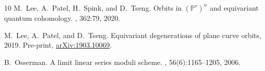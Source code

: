 \documentclass[11pt]{amsart}
\begin{document}
\begin{thebibliography}{10}
M.~Lee, A.~Patel, H.~Spink, and D.~Tseng.
\newblock Orbits in {{\((\mathbb{P}^r)^n\)}} and equivariant quantum
  cohomology.
, 362:79, 2020.

M.~Lee, A.~Patel, and D.~Tseng.
\newblock Equivariant degenerations of plane curve orbits, 2019.
\newblock Pre-print, \href{https://arxiv.org/abs/1903.10069}{arXiv:1903.10069}.

B.~Osserman.
\newblock A limit linear series moduli scheme.
, 56(6):1165--1205, 2006.

\end{thebibliography}
 
\end{document}
